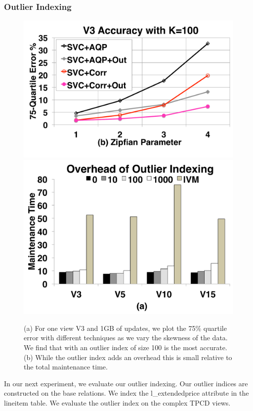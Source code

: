 \subsubsection{Outlier Indexing}

\begin{figure}[t] \vspace{-.5em}
\centering
 \includegraphics[scale=0.13]{exp/msoi_2.pdf}
 \includegraphics[scale=0.13]{exp/msoi_1.pdf}\vspace{-1em}
 \caption{(a) For one view V3 and 1GB of updates, we plot the 75\% quartile error with different techniques as we vary the skewness of the data. We find that \svc with an outlier index of size 100 is the most accurate. (b) While the outlier index adds an overhead this is small relative to the total maintenance time. \vspace{-1.5em}\label{exp5-oi}}
\end{figure}
In our next experiment, we evaluate our outlier indexing.
Our outlier indices are constructed on the base relations.
We index the \textsf{l\_extendedprice} attribute in the \textsf{lineitem} table.
We evaluate the outlier index on the complex TPCD views.

